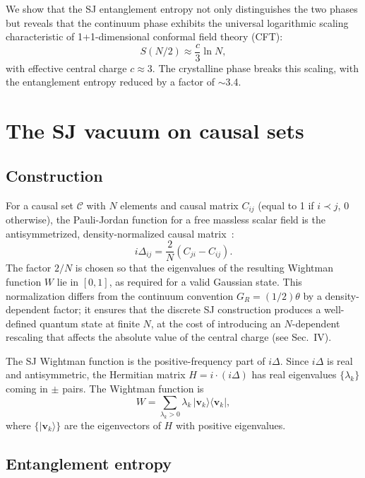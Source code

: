\documentclass[aps,prd,twocolumn,superscriptaddress,nofootinbib]{revtex4-2}
\begin{document}
We show that the SJ entanglement entropy not only distinguishes the two phases but reveals that the continuum phase exhibits the universal logarithmic scaling characteristic of 1+1-dimensional conformal field theory (CFT):
\begin{equation}
S(N/2) \approx \frac{c}{3} \ln N,
\label{eq:cft}
\end{equation}
with effective central charge $c \approx 3$. The crystalline phase breaks this scaling, with the entanglement entropy reduced by a factor of $\sim$3.4.

\section{The SJ vacuum on causal sets}

\subsection{Construction}

For a causal set $\mathcal{C}$ with $N$ elements and causal matrix $C_{ij}$ (equal to 1 if $i \prec j$, 0 otherwise), the Pauli-Jordan function for a free massless scalar field is the antisymmetrized, density-normalized causal matrix~\cite{johnston2009,sorkin2012}:
\begin{equation}
i\Delta_{ij} = \frac{2}{N}\left(C_{ji} - C_{ij}\right).
\end{equation}
The factor $2/N$ is chosen so that the eigenvalues of the resulting Wightman function $W$ lie in $[0, 1]$, as required for a valid Gaussian state. This normalization differs from the continuum convention $G_R = (1/2)\theta$ by a density-dependent factor; it ensures that the discrete SJ construction produces a well-defined quantum state at finite $N$, at the cost of introducing an $N$-dependent rescaling that affects the absolute value of the central charge (see Sec.~IV).

The SJ Wightman function is the positive-frequency part of $i\Delta$. Since $i\Delta$ is real and antisymmetric, the Hermitian matrix $H = i \cdot (i\Delta)$ has real eigenvalues $\{\lambda_k\}$ coming in $\pm$ pairs. The Wightman function is
\begin{equation}
W = \sum_{\lambda_k > 0} \lambda_k \, |\mathbf{v}_k\rangle\langle\mathbf{v}_k|,
\end{equation}
where $\{|\mathbf{v}_k\rangle\}$ are the eigenvectors of $H$ with positive eigenvalues.

\subsection{Entanglement entropy}
\end{document}
